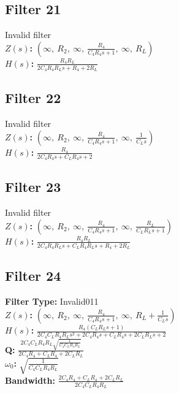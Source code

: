 \documentclass{article}
\begin{document}
\subsection*{Filter 21}
Invalid filter \\ 
\textbf{$Z(s)$:} $\left( \infty, \  R_{2}, \  \infty, \  \frac{R_{4}}{C_{4} R_{4} s + 1}, \  \infty, \  R_{L}\right)$ \\ 
\textbf{$H(s)$:} $\frac{R_{4} R_{L}}{2 C_{4} R_{4} R_{L} s + R_{4} + 2 R_{L}}$ \\ 
\subsection*{Filter 22}
Invalid filter \\ 
\textbf{$Z(s)$:} $\left( \infty, \  R_{2}, \  \infty, \  \frac{R_{4}}{C_{4} R_{4} s + 1}, \  \infty, \  \frac{1}{C_{L} s}\right)$ \\ 
\textbf{$H(s)$:} $\frac{R_{4}}{2 C_{4} R_{4} s + C_{L} R_{4} s + 2}$ \\ 
\subsection*{Filter 23}
Invalid filter \\ 
\textbf{$Z(s)$:} $\left( \infty, \  R_{2}, \  \infty, \  \frac{R_{4}}{C_{4} R_{4} s + 1}, \  \infty, \  \frac{R_{L}}{C_{L} R_{L} s + 1}\right)$ \\ 
\textbf{$H(s)$:} $\frac{R_{4} R_{L}}{2 C_{4} R_{4} R_{L} s + C_{L} R_{4} R_{L} s + R_{4} + 2 R_{L}}$ \\ 
\subsection*{Filter 24}
\textbf{Filter Type:} Invalid011 \\ 
\textbf{$Z(s)$:} $\left( \infty, \  R_{2}, \  \infty, \  \frac{R_{4}}{C_{4} R_{4} s + 1}, \  \infty, \  R_{L} + \frac{1}{C_{L} s}\right)$ \\ 
\textbf{$H(s)$:} $\frac{R_{4} \left(C_{L} R_{L} s + 1\right)}{2 C_{4} C_{L} R_{4} R_{L} s^{2} + 2 C_{4} R_{4} s + C_{L} R_{4} s + 2 C_{L} R_{L} s + 2}$ \\ 
\textbf{Q:} $\frac{2 C_{4} C_{L} R_{4} R_{L} \sqrt{\frac{1}{C_{4} C_{L} R_{4} R_{L}}}}{2 C_{4} R_{4} + C_{L} R_{4} + 2 C_{L} R_{L}}$ \\ 
\textbf{$\omega_0$:} $\sqrt{\frac{1}{C_{4} C_{L} R_{4} R_{L}}}$ \\ 
\textbf{Bandwidth:} $\frac{2 C_{4} R_{4} + C_{L} R_{4} + 2 C_{L} R_{L}}{2 C_{4} C_{L} R_{4} R_{L}}$ \\ 
\end{document}
